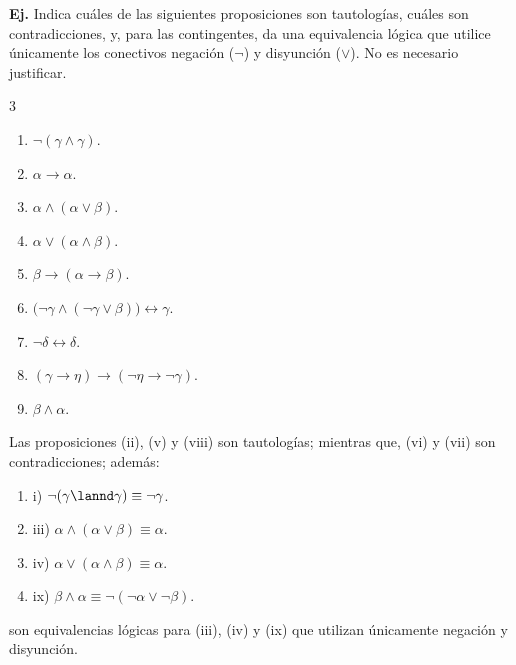 \documentclass[letterpaper,DIV=14,headsepline,12pt]{scrartcl}
\makeatletter
\newcounter{Ejer}
\newcommand{\pts}{}
\newenvironment{ejercicio}[1]{\noindent
    \ifthenelse{\equal{#1}{1} \OR \equal{#1}{+1}}{\renewcommand{\pts}{\textbf{(#1 pt)}}}{\renewcommand{\pts}{\textbf{(#1 pts)}}}\textbf{Ej. \theEjer} \pts\stepcounter{Ejer}}{\vspace{.3cm}}
\newenvironment{solu}[1][]{%
        \par\pushQED{\hfill \lozenge}%
        \normalfont\topsep6pt \partopsep0pt %
        \trivlist
        \item[\hskip\labelsep
                \textbf{\textit{Solución.}}%
        ]#1
        }{%
        \popQED\endtrivlist\@endpefalse
    }
\makeatother
\begin{document}
    \begin{ejercicio}{1}
        Indica cuáles de las siguientes proposiciones son tautologías, cuáles son contradicciones, y, para las contingentes, da una equivalencia lógica que utilice únicamente los conectivos negación ($\lnot$) y disyunción ($\lor$). No es necesario justificar.
        \begin{multicols}{3}
            \begin{enumerate}
                \item $\lnot (\gamma \land \gamma)$.
                \item $\alpha \to \alpha$.
                \item $\alpha \land (\alpha \lor \beta)$.
                \item $\alpha \lor (\alpha \land \beta)$.
                \item $\beta \to (\alpha \to \beta)$.
                \item $\big( \lnot \gamma \land (\lnot \gamma \lor \beta) \big) \leftrightarrow \gamma$.
                \item $\lnot \delta \leftrightarrow \delta$.
                \item $(\gamma \to \eta) \to (\lnot \eta \to \lnot \gamma)$.
                \item $\beta \land \alpha$.
            \end{enumerate}
        \end{multicols}
    \end{ejercicio}
    \begin{solu}
        Las proposiciones (ii), (v) y (viii) son tautologías; mientras que, (vi) y (vii) son contradicciones; además:
        \begin{enumerate}[\hspace{1.5cm}]
            \item i) $\lnot (\gamma \lannd \gamma) \equiv \lnot \gamma$.
            \item iii) $\alpha \land (\alpha \lor \beta) \equiv \alpha$.
            \item iv) $\alpha \lor (\alpha \land \beta) \equiv \alpha$.
            \item ix) $\beta \land \alpha \equiv \lnot ( \lnot \alpha \lor \lnot \beta )$.
        \end{enumerate}
        son equivalencias lógicas para (iii), (iv) y (ix) que utilizan únicamente negación y disyunción.
    \end{solu}
\end{document}
